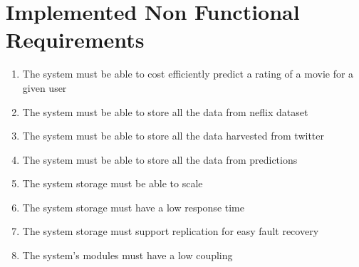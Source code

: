 \section{Implemented Non Functional Requirements}
\begin{enumerate}[label=\bfseries NFR \arabic*:]
  \item {\color{RedOrange}The system must be able to cost efficiently predict a rating of a movie for a given user}
  \item {\color{OliveGreen}The system must be able to store all the data from neflix dataset}
  \item {\color{OliveGreen}The system must be able to store all the data harvested from twitter}
  \item {\color{RedOrange}The system must be able to store all the data from predictions}
  \item {\color{OliveGreen}The system storage must be able to scale}
  \item {\color{OliveGreen}The system storage must have a low response time}
  \item {\color{OliveGreen}The system storage must support replication for easy fault recovery}
  \item {\color{OliveGreen}The system's modules must have a low coupling}
\end{enumerate}



